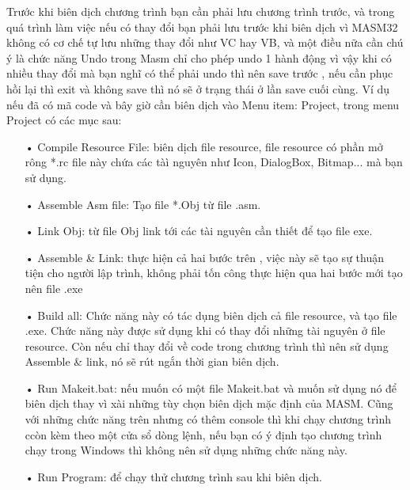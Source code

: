 	Trước khi biên dịch chương trình bạn cần phải lưu chương trình trước, và trong quá trình làm việc nếu có thay đổi bạn phải lưu trước khi biên dịch vì MASM32 không có cơ chế tự lưu những thay đổi như VC hay VB, và một điều nữa cần chú ý là chức năng Undo trong Masm chỉ cho phép undo 1 hành động vì vậy khi có nhiều thay đổi mà bạn nghĩ có thể phải undo thì nên save trước , nếu cần phục hồi lại thì exit và không save thì nó sẽ ở trạng thái ở lần save cuối cùng. Ví dụ nếu đã có mã code và bây giờ cần biên dịch vào Menu item: Project, trong menu Project có các mục sau: 
		\begin{itemize}
			\item[•] Compile Resource File: biên dịch file resource, file resource có phần mở rông *.rc file này chứa các tàì nguyên như Icon, DialogBox, Bitmap... mà bạn sử dụng. 
		\item[•] Assemble Asm file: Tạo file *.Obj từ file .asm. 
		\item[•]  Link Obj: từ file Obj link tới các tài nguyên cần thiết để tạo file exe.
		 \item[•]  Assemble \& Link: thực hiện cả hai bước trên , việc này sẽ tạo sự thuận tiện cho người lập trình, không phải tốn công thực hiện qua hai bước mới tạo nên file .exe
		 \item[•]  Build all: Chức năng này có tác dụng biên dịch cả file resource, và tạo file .exe. Chức năng này được sử dụng khi  có thay đổi những tài nguyên ở file resource. Còn nếu chỉ thay đổi về code trong chương trình thì nên sử dụng Assemble \& link, nó sẽ rút ngắn thời gian biên dịch.
		 \item[•]  Run Makeit.bat: nếu muốn có một file Makeit.bat và muốn sử dụng nó để biên dịch thay vì xài những tùy chọn biên dịch mặc định của MASM. Cũng với những chức năng trên nhưng có thêm console thì khi chạy chương trình ccòn kèm theo một cửa sổ dòng lệnh, nếu bạn có ý định tạo chương trình chạy trong Windows thì không nên sử dụng những chức năng này.
		   \item[•]  Run Program: để chạy thử chương trình sau khi biên dịch. 
		\end{itemize}
		

